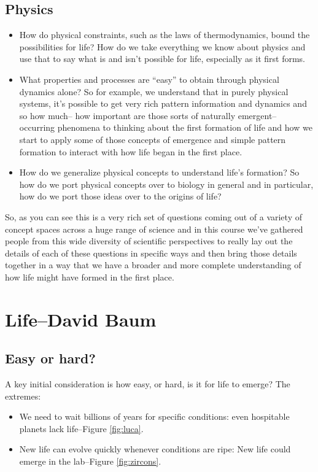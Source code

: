 \documentclass[]{article}
\begin{document}
	
\subsection{Physics}

\begin{itemize}
	\item How do physical constraints, such as the laws of thermodynamics, bound the possibilities for life? How do we take everything we know about
	physics and use that to say what is and
	isn't possible for life, especially as it 
	first forms.
	\item What properties and processes are “easy” to obtain through physical dynamics alone?	So for example, we understand that in
	purely physical systems, it's possible to
	get very rich pattern information and
	dynamics and so how much-- how important
	are those sorts of naturally emergent--
	occurring phenomena to thinking about the
	first formation of life and how we start
	to apply some of those concepts of
	emergence and simple pattern formation to
	interact with
	how life began in the first place.
	\item How do we generalize physical concepts to understand life’s formation? So how do we port physical concepts over
	to biology in general and in particular,
	how do we port those ideas over to the
	origins of life?
\end{itemize}	

So, as you can see this is a very rich set of questions coming out of a variety of concept spaces across a huge range of science and in this course we've gathered people from this wide diversity of scientific perspectives to really lay out the details of each of these questions in specific ways and then bring those details together in a way that we have a broader and more complete understanding of how life might have formed in the first place.



\section[Life]{Life--David Baum}

\subsection{Easy or hard?}
A key initial consideration is how easy, or hard, is it for life to emerge?
The extremes:
\begin{itemize}
	\item We need to wait billions of years for specific conditions: even hospitable planets lack life--Figure \ref{fig:luca}.
	\item New life can evolve quickly whenever conditions are ripe:  New life could emerge in the lab--Figure \ref{fig:zircons}.
\end{itemize}
\end{document}
